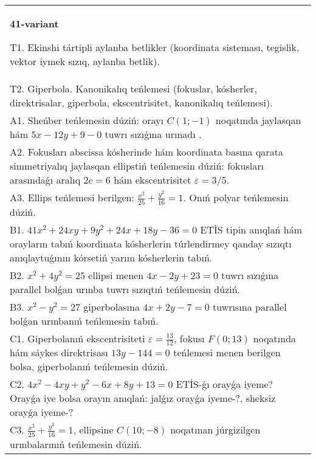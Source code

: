 \documentclass{article}
\begin{document}
\begin{tabular}{m{17cm}}
\textbf{41-variant}
\newline

T1. Ekinshi tártipli aylanba betlikler (koordinata sisteması, tegislik, vektor iymek sızıq, aylanba betlik).\\

T2. Giperbola. Kanonikalıq teńlemesi (fokuslar, kósherler, direktrisalar, giperbola, ekscentrisitet, kanonikalıq teńlemesi).\\

A1. Sheńber teńlemesin dúziń: orayı $C (1;-1) $ noqatında jaylasqan hám $5 x-12 y+9 -0$ tuwrı sızıǵına urınadı .\\

A2. Fokusları abscissa kósherinde hám koordinata basına qarata simmetriyalıq jaylasqan ellipstiń teńlemesin dúziń: fokusları arasındaǵı aralıq $2 c=6$ hám ekscentrisitet $\varepsilon=3/5$.\\

A3. Ellips teńlemesi berilgen: $\frac{x^2}{25}+\frac{y^2}{16}=1$. Onıń polyar teńlemesin dúziń.\\

B1. $41x^{2} + 24xy + 9y^{2} + 24x + 18y - 36 = 0$ ETİS tipin anıqlań hám orayların tabıń koordinata kósherlerin túrlendirmey qanday sızıqtı anıqlaytuǵının kórsetiń yarım kósherlerin tabıń.  \\

B2. $x^{2} + 4y^{2} = 25$ ellipsi menen $4x - 2y + 23 = 0$ tuwrı sızıǵına parallel bolǵan urınba tuwrı sızıqtıń teńlemesin dúziń.  \\

B3. $x^{2} - y^{2} = 27$ giperbolasına $4x + 2y - 7 = 0$ tuwrısına parallel bolǵan urınbanıń teńlemesin tabıń.  \\

C1. Giperbolanıń ekscentrisiteti $\varepsilon = \frac{13}{12}$, fokusı $F(0;13)$ noqatında hám sáykes direktrisası $13y - 144 = 0$ teńlemesi menen berilgen bolsa, giperbolanıń teńlemesin dúziń.  \\

C2. $4x^{2} - 4xy + y^{2} - 6x + 8y + 13 = 0$ ETİS-ǵı orayǵa iyeme? Orayǵa iye bolsa orayın anıqlań: jalǵız orayǵa iyeme-?, sheksiz orayǵa iyeme-?  \\

C3. $\frac{x^{2}}{25} + \frac{y^{2}}{16} = 1$, ellipsine $C(10; - 8)$ noqatınan júrgizilgen urınbalarınıń teńlemesin dúziń.  \\

\end{tabular}
\vspace{1cm}
\end{document}
